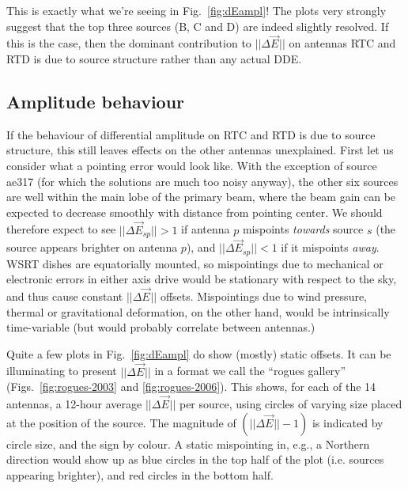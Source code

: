 \documentclass[]{aa}
\newcommand{\jones}[2]{\vec {#1}_{#2}}
\begin{document}
This is exactly what we're seeing in Fig.~\ref{fig:dEampl}! The plots very strongly suggest that the top three sources (B, C and D) are indeed slightly resolved. If this is the case, then the dominant contribution to $||\Delta\jones{E}{}||$ on antennas RTC and RTD is due to source structure rather than any actual DDE. 

\subsection{Amplitude behaviour}

If the behaviour of differential amplitude on RTC and RTD is due to source structure, this still leaves effects on the other antennas unexplained. First let us consider what a pointing error would look like. With the exception of source ae317 (for which the solutions are much too noisy anyway), the other six sources are well within the main lobe of the primary beam, where the beam gain can be expected to decrease smoothly with distance from pointing center. We should therefore expect to see $||\Delta\jones{E}{sp}||>1$ if antenna $p$ mispoints \emph{towards} source $s$ (the source appears brighter on antenna $p$), and $||\Delta\jones{E}{sp}||<1$ if it mispoints \emph{away}. WSRT dishes are equatorially mounted, so mispointings due to mechanical or electronic errors in either axis drive would be stationary with respect to the sky, and thus cause constant 
$||\Delta\jones{E}{}||$ offsets. Mispointings due to wind pressure, thermal or gravitational deformation, on the other hand, would be intrinsically time-variable (but would probably correlate between antennas.)

Quite a few plots in Fig.~\ref{fig:dEampl} do show (mostly) static offsets. It can be illuminating to present $||\Delta\jones{E}{}||$ in a format we call the ``rogues gallery'' (Figs.~\ref{fig:rogues-2003} and \ref{fig:rogues-2006}). This shows, for each of the 14 antennas, a 12-hour average $||\Delta\jones{E}{}||$ per source, using circles of varying size placed at the position of the source. The magnitude of $(||\Delta\jones{E}{}||-1)$ is indicated by circle size, and the sign by colour. A static mispointing in, e.g., a Northern direction would show up as blue circles in the top half of the plot (i.e. sources appearing brighter), and red circles in the bottom half.

\newlength{\roguewidth}
\setlength{\roguewidth}{.2\columnwidth} %
\end{document}
